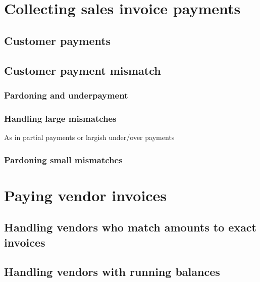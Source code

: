 \chapter{Collecting sales invoice payments}
\label{cha-starting-sales-customer-payments}

\section{Customer payments}
\label{sec-starting-sales-customer-payments}

\section{Customer payment mismatch}
\label{sec-starting-sales-payment-mismatch}

\subsection{Pardoning and underpayment}
\label{subsec-sales-payment-mismatch}

\subsection{Handling large mismatches}
\label{subsec-sales-payment-partial}

 As in partial payments or largish under/over payments
 
\subsection{Pardoning small mismatches}
\label{subsec-sales-payment-pardoning}



\chapter{Paying vendor invoices}
\label{cha-starting-vendor-payments}

\section{Handling vendors who match amounts to exact invoices}
\label{sec-vendor-invoice-exact-match}

\section{Handling vendors with running balances}
\label{sec-vendor-invoice-running-balance}

